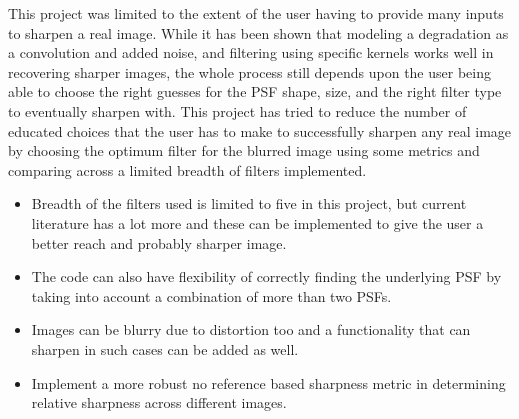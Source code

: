\noindent This project was limited to the extent of the user having to provide many inputs to sharpen a real image. 
While it has been shown that modeling a degradation as a convolution and added noise, and filtering using specific kernels works well in recovering sharper images, the whole process still depends upon the user being able to choose the right guesses for the PSF shape, size, and the right filter type to eventually sharpen with. This project has tried to reduce the number of educated choices that the user has to make to successfully sharpen any real image by choosing the optimum filter for the blurred image using some metrics and comparing across a limited breadth of filters implemented.
\begin{itemize}
\item Breadth of the filters used is limited to five in this project, but current literature has a lot more and these can be implemented to give the user a better reach and probably sharper image.
\item The code can also have flexibility of correctly finding the underlying PSF by taking into account a combination of more than two PSFs. 
\item Images can be blurry due to distortion too and a functionality that can sharpen in such cases can be added as well.
\item Implement a more robust no reference based sharpness metric in determining relative sharpness across different images.
\end{itemize}




\newpage